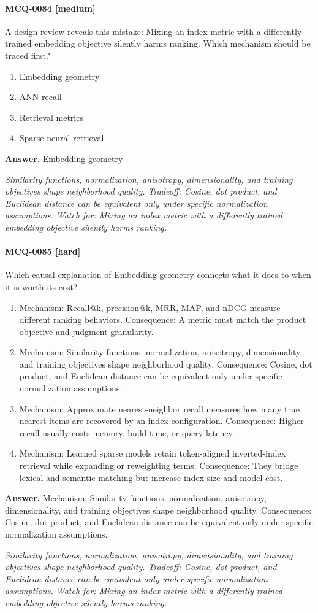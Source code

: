 \paragraph{MCQ-0084 [medium]} A design review reveals this mistake: Mixing an index metric with a differently trained embedding objective silently harms ranking. Which mechanism should be traced first?
\begin{enumerate}[label=\Alph*.]
\item Embedding geometry
\item ANN recall
\item Retrieval metrics
\item Sparse neural retrieval
\end{enumerate}
\noindent\textbf{Answer.} Embedding geometry
\par\textit{Similarity functions, normalization, anisotropy, dimensionality, and training objectives shape neighborhood quality. Tradeoff: Cosine, dot product, and Euclidean distance can be equivalent only under specific normalization assumptions. Watch for: Mixing an index metric with a differently trained embedding objective silently harms ranking.}
\paragraph{MCQ-0085 [hard]} Which causal explanation of Embedding geometry connects what it does to when it is worth its cost?
\begin{enumerate}[label=\Alph*.]
\item Mechanism: Recall@k, precision@k, MRR, MAP, and nDCG measure different ranking behaviors. Consequence: A metric must match the product objective and judgment granularity.
\item Mechanism: Similarity functions, normalization, anisotropy, dimensionality, and training objectives shape neighborhood quality. Consequence: Cosine, dot product, and Euclidean distance can be equivalent only under specific normalization assumptions.
\item Mechanism: Approximate nearest-neighbor recall measures how many true nearest items are recovered by an index configuration. Consequence: Higher recall usually costs memory, build time, or query latency.
\item Mechanism: Learned sparse models retain token-aligned inverted-index retrieval while expanding or reweighting terms. Consequence: They bridge lexical and semantic matching but increase index size and model cost.
\end{enumerate}
\noindent\textbf{Answer.} Mechanism: Similarity functions, normalization, anisotropy, dimensionality, and training objectives shape neighborhood quality. Consequence: Cosine, dot product, and Euclidean distance can be equivalent only under specific normalization assumptions.
\par\textit{Similarity functions, normalization, anisotropy, dimensionality, and training objectives shape neighborhood quality. Tradeoff: Cosine, dot product, and Euclidean distance can be equivalent only under specific normalization assumptions. Watch for: Mixing an index metric with a differently trained embedding objective silently harms ranking.}
